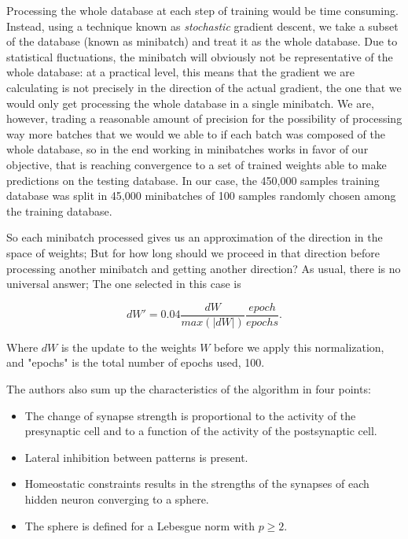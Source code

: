 \documentclass[a4paper]{report}
\begin{document}
Processing the whole database at each step of training would be time consuming. Instead, using a technique known as \textit{stochastic} gradient descent, we take a subset of the database  (known as minibatch) and treat it as the whole database. Due to statistical fluctuations, the minibatch will obviously not be representative of the whole database: at a practical level, this means that the gradient we are calculating is not precisely in the direction of the actual gradient, the one that we would only get processing the whole database in a single minibatch.
We are, however, trading a reasonable amount of precision for the possibility of processing way more batches that we would we able to if each batch was composed of the whole database, so in the end working in minibatches works in favor of our objective, that is reaching convergence to a set of trained weights able to make predictions on the testing database.
In our case, the 450,000 samples training database was split in 45,000 minibatches of 100 samples randomly chosen among the training database.

So each minibatch processed gives us an approximation of the direction in the space of weights; But for how long should we proceed in that direction before processing another minibatch and getting another direction?
As usual, there is no universal answer; The one selected in this case is

\begin{equation}
	dW'=0.04\frac{dW}{max(|dW|)}\frac{epoch}{epochs}.
\end{equation}

Where $dW$ is the update to the weights $W$ before we apply this normalization, and "epochs" is the total number of epochs used, 100.

The authors also sum up the characteristics of the algorithm  in four points:
\begin{itemize}
	\item The change of synapse strength is proportional to the activity of the presynaptic cell and to a function of the activity of the postsynaptic cell.
	\item Lateral inhibition between patterns is present.
	\item Homeostatic constraints results in the strengths of the synapses of each hidden neuron converging to a sphere.
	\item The sphere is defined for a Lebesgue norm with $p \geq 2$.
\end{itemize}
\end{document}
